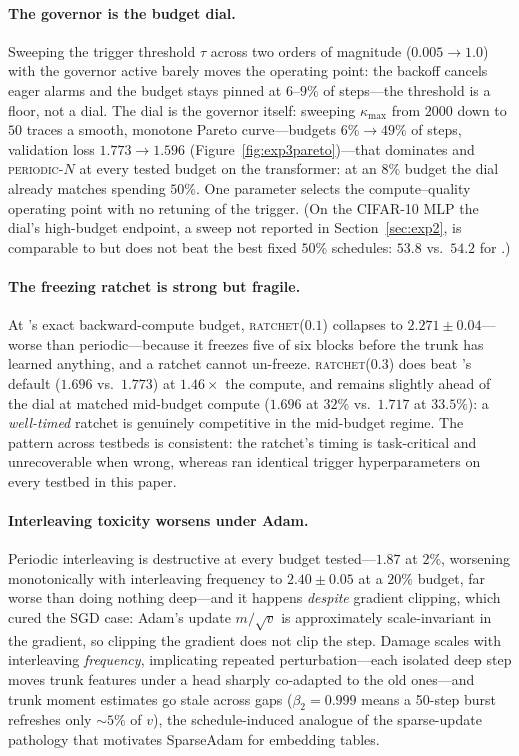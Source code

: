 \paragraph{The governor is the budget dial.} Sweeping the trigger
threshold $\tau$ across two orders of magnitude ($0.005 \to 1.0$) with the
governor active barely moves the operating point: the backoff cancels eager
alarms and the budget stays pinned at $6$--$9\%$ of steps---the threshold
is a floor, not a dial. The dial is the governor itself: sweeping
$\kappa_{\max}$ from $2000$ down to $50$ traces a smooth, monotone Pareto
curve---budgets $6\% \to 49\%$ of steps, validation loss $1.773 \to
1.596$ (Figure~\ref{fig:exp3pareto})---that dominates \lpft{} and
\textsc{periodic}-$N$ at every tested budget on the transformer: at an
$8\%$ budget the dial already matches \lpft{} spending $50\%$. One
parameter selects the compute--quality operating point with no retuning of
the trigger. (On the CIFAR-10 MLP the dial's high-budget endpoint, a sweep
not reported in Section~\ref{sec:exp2}, is comparable to but does not beat
the best fixed $50\%$ schedules: $53.8$ vs.\ $54.2$ for \lpft{}.)

\paragraph{The freezing ratchet is strong but fragile.} At
\fw{}'s exact backward-compute budget, \textsc{ratchet}($0.1$) collapses to
$2.271 \pm 0.04$---worse than periodic---because it freezes five of six
blocks before the trunk has learned anything, and a ratchet cannot
un-freeze. \textsc{ratchet}($0.3$) does beat \fw{}'s default ($1.696$ vs.\
$1.773$) at $1.46\times$ the compute, and remains slightly ahead of the
\fw{} dial at matched mid-budget compute ($1.696$ at $32\%$ vs.\ $1.717$ at
$33.5\%$): a \emph{well-timed} ratchet is genuinely competitive in the
mid-budget regime. The pattern across testbeds is consistent: the ratchet's
timing is task-critical and unrecoverable when wrong, whereas \fw{} ran
identical trigger hyperparameters on every testbed in this paper.

\paragraph{Interleaving toxicity worsens under Adam.} Periodic
interleaving is destructive at every budget
tested---$1.87$ at $2\%$, worsening monotonically with interleaving
frequency to $2.40 \pm 0.05$ at a $20\%$ budget, far worse than doing
nothing deep---and it happens \emph{despite} gradient clipping, which cured
the SGD case: Adam's update $m/\sqrt{v}$ is approximately scale-invariant
in the gradient, so clipping the gradient does not clip the step. Damage
scales with interleaving \emph{frequency}, implicating repeated
perturbation---each isolated deep step moves trunk features under a head
sharply co-adapted to the old ones---and trunk moment estimates go stale
across gaps ($\beta_2 = 0.999$ means a 50-step burst refreshes only
${\sim}5\%$ of $v$), the schedule-induced analogue of the sparse-update
pathology that motivates SparseAdam for embedding tables.

